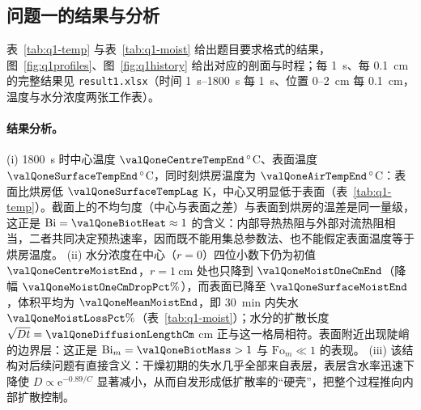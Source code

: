 \subsection{问题一的结果与分析}

表~\ref{tab:q1-temp} 与表~\ref{tab:q1-moist} 给出题目要求格式的结果，图~\ref{fig:q1profiles}、图~\ref{fig:q1history} 给出对应的剖面与时程；每 \SI{1}{\second}、每 \SI{0.1}{\centi\meter} 的完整结果见 \nolinkurl{result1.xlsx}（时间 \SI{1}{\second}--\SI{1800}{\second} 每 \SI{1}{\second}、位置 $0$--\SI{2}{\centi\meter} 每 \SI{0.1}{\centi\meter}，温度与水分浓度两张工作表）。






\paragraph{结果分析。} (i) \SI{1800}{\second} 时中心温度 $\valQoneCentreTempEnd\,^\circ$C、表面温度 $\valQoneSurfaceTempEnd\,^\circ$C，同时刻烘房温度为 $\valQoneAirTempEnd\,^\circ$C：表面比烘房低 $\valQoneSurfaceTempLag$ \si{\kelvin}，中心又明显低于表面（表~\ref{tab:q1-temp}）。截面上的不均匀度（中心与表面之差）与表面到烘房的温差是同一量级，这正是 $\mathrm{Bi}=\valQoneBiotHeat\approx1$ 的含义：内部导热热阻与外部对流热阻相当，二者共同决定预热速率，因而既不能用集总参数法、也不能假定表面温度等于烘房温度。
(ii) 水分浓度在中心（$r=0$）四位小数下仍为初值 $\valQoneCentreMoistEnd$，$r=\SI{1}{\centi\meter}$ 处也只降到 $\valQoneMoistOneCmEnd$（降幅 $\valQoneMoistOneCmDropPct\%$），而表面已降至 $\valQoneSurfaceMoistEnd$，体积平均为 $\valQoneMeanMoistEnd$，即 \SI{30}{\minute} 内失水 $\valQoneMoistLossPct\%$（表~\ref{tab:q1-moist}）；水分的扩散长度 $\sqrt{Dt}=\valQoneDiffusionLengthCm$ \si{\centi\meter} 正与这一格局相符。表面附近出现陡峭的边界层：这正是 $\mathrm{Bi}_m=\valQoneBiotMass>1$ 与 $\mathrm{Fo}_m\ll1$ 的表现。
(iii) 该结构对后续问题有直接含义：干燥初期的失水几乎全部来自表层，表层含水率迅速下降使 $D\propto\mathrm{e}^{-0.89/C}$ 显著减小，从而自发形成低扩散率的“硬壳”，把整个过程推向内部扩散控制。

